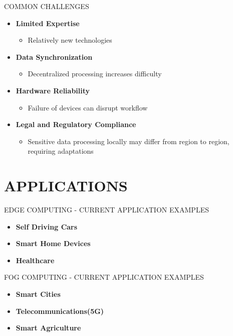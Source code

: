 \documentclass[aspectratio=169,xcolor=dvipsnames]{beamer}
\begin{document}
\begin{frame}{COMMON CHALLENGES}
    \begin{itemize}
        \item \textbf{Limited Expertise}
        \begin{itemize}
            \item Relatively new technologies
        \end{itemize}
         \item \textbf{Data Synchronization}
         \begin{itemize}
            \item Decentralized processing increases difficulty
        \end{itemize}
        \item \textbf{Hardware Reliability}
        \begin{itemize}
            \item Failure of devices can disrupt workflow
        \end{itemize}
         \item \textbf{Legal and Regulatory Compliance}
         \begin{itemize}
            \item Sensitive data processing locally may differ from region to region, requiring adaptations
        \end{itemize}
    \end{itemize}
\end{frame}

\section{APPLICATIONS}

\begin{frame}{EDGE COMPUTING - CURRENT APPLICATION EXAMPLES}
    \begin{itemize}
        \item \textbf{Self Driving Cars}
        \item \textbf{Smart Home Devices}
        \item \textbf{Healthcare}
    \end{itemize}
\end{frame}

\begin{frame}{FOG COMPUTING - CURRENT APPLICATION EXAMPLES}
    \begin{itemize}
        \item \textbf{Smart Cities}
        \item \textbf{Telecommunications(5G)}
        \item \textbf{Smart Agriculture}
    \end{itemize}
\end{frame}
\end{document}
